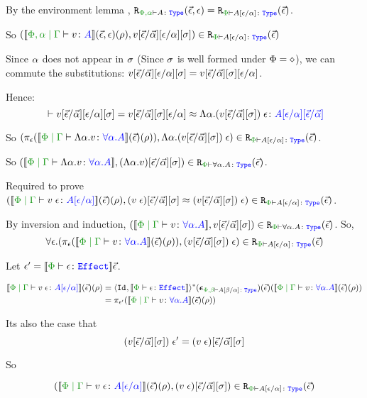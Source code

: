\documentclass{Report}
\newcommand\erelates[2]{\texttt{R}_{\wellformedt{#1}{#2}}}
\newcommand{\av}[0]{\vec{\a}}
\newcommand\inLogRel[5]{(#1, #2)\in\erelates{#3}{#4}(#5)}
\newcommand\inLogRelE[4]{\inLogRel{#1}{#2}{#3}{#4}{\ev}}
\newcommand{\inLogRelPE}[3]{\inLogRelE{#1}{#2}{\P}{#3}}
\newcommand\fundSub[0]{\ssub{\av}{\ev}\ssi}
\newcommand\fundRho[0]{(\ev)(\rho)}
\begin{document}
By the environment lemma , $\erelates{\P, \a}{A}(\ev, \e) = \erelates{\P}{A\ssub{\a}{\e}}(\ev)$.


So $\inLogRelPE{\deno{\etyperelation{\P,\a}{\G}{v}{A}}(\ev, \e)(\rho)}{v\ssub{\av}{\ev}\ssub{\a}{\e}\ssi}{A\ssub{\a}{\e}}$

Since $\alpha$ does not appear in $\sigma$ (Since $\sigma$ is well formed under $\Phi = \diamond$), we can commute the substitutions: $v\ssub{\av}{\ev}\ssub{\a}{\e}\ssi = v\ssub{\av}{\ev}\ssi\ssub{\a}{\e}$.

Hence: 
\begin{equation*}
    \zberelation{v\ssub{\av}{\ev}\ssub{\a}{\e}\ssi = v\ssub{\av}{\ev}\ssi\ssub{\a}{\e}}{\eapp{\elam{\a}{(v\fundSub)}}{\e}}{A\ssub{\a}{\e}\ssub{\av}{\ev}}
\end{equation*}

So $\inLogRelPE{    \pe(\deno{\gpetyperelation{\elam{\a}{v}}{\all{\a}{A}}}\fundRho)}{\eapp{\elam{\a}{(v\fundSub)}}{\e}}{A\ssub{\a}{\e}}$.

So $\inLogRelPE{\deno{\gpetyperelation{\elam{\a}{v}}{\all{\a}{A}}}}{(\elam{\a}{v})\fundSub}{\all{\a}{A}}$.


\case{\vspec}
Required to prove $\inLogRelPE{\deno{\gpetyperelation{\eapp{v}{\e}}{A\ssub{\a}{\e}}}\fundRho}{(\eapp{v}{\e})\fundSub\beequiv\eapp{(v\fundSub)}{\e}}{A\ssub{\a}{\e}}$.

By inversion and induction, $\inLogRelPE{\deno{\gpetyperelation{v}{\all{\a}{A}}}}{v\fundSub}{\all{\a}{A}}$. So, $$\forall\e. \inLogRelPE{\pe(\deno{\gpetyperelation{v}{\all{\a}{A}}}\fundRho)}{\eapp{(v\fundSub)}{\e}}{A\ssub{\a}{\e}}$$

Let $\e' = \deno{\wellformede{\P}{\e}}\ev$.

\begin{align*}
    \deno{\gpetyperelation{\eapp{v}{\e}}{A\ssub{\a}{\e}}}\fundRho 
    & = \pr{\Id{}}{\deno{\wellformede{\P}{\e}}}\star(\counit{\wellformedt{\P,\b}{A\ssub{\a}{\b}}})(\ev)(\deno{\gpetyperelation{v}{\all{\a}{A}}}\fundRho)\\
    & = \pi_{\e'}(\deno{\gpetyperelation{v}{\all{\a}{A}}}\fundRho)
\end{align*}

Its also the case that
\begin{equation}
    \eapp{(v\fundSub)}{\e'} = (\eapp{v}{\e})\fundSub
\end{equation}

So

\begin{equation}
    \inLogRelPE{\deno{\gpetyperelation{\eapp{v}{\e}}{A\ssub{\a}{\e}}}\fundRho }{(\eapp{v}{\e})\fundSub}{A\ssub{\a}{\e}}
\end{equation}
\end{document}
